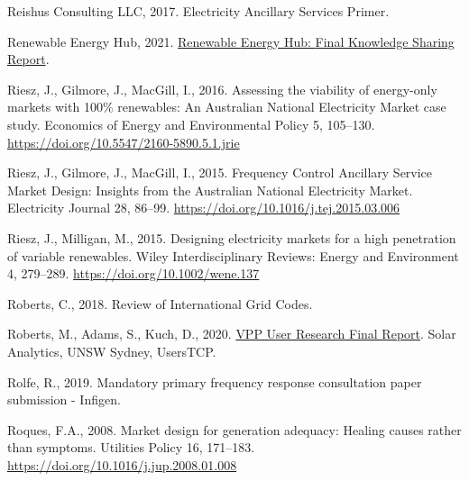 \documentclass[12pt,a4paper,]{report}
\newlength{\cslhangindent}
\newenvironment{CSLReferences}[2] %
 {%
  \setlength{\parindent}{0pt}
  \ifodd #1 \everypar{\setlength{\hangindent}{\cslhangindent}}\ignorespaces\fi
  \ifnum #2 > 0
  \setlength{\parskip}{#2\baselineskip}
  \fi
 }%
 {}
\begin{document}
\begin{CSLReferences}{1}{0}
\leavevmode{}%
Reishus Consulting LLC, 2017. Electricity {Ancillary Services Primer}.

\leavevmode{}%
Renewable Energy Hub, 2021.
\href{https://arena.gov.au/assets/2021/04/renewable-energy-hub-final-report.pdf}{Renewable
{Energy Hub}: {Final Knowledge Sharing Report}}.

\leavevmode{}%
Riesz, J., Gilmore, J., MacGill, I., 2016. Assessing the viability of
energy-only markets with 100\% renewables: {An Australian National
Electricity Market} case study. Economics of Energy and Environmental
Policy 5, 105--130. \url{https://doi.org/10.5547/2160-5890.5.1.jrie}

\leavevmode{}%
Riesz, J., Gilmore, J., MacGill, I., 2015. Frequency {Control Ancillary
Service Market Design}: {Insights} from the {Australian National
Electricity Market}. Electricity Journal 28, 86--99.
\url{https://doi.org/10.1016/j.tej.2015.03.006}

\leavevmode{}%
Riesz, J., Milligan, M., 2015. Designing electricity markets for a high
penetration of variable renewables. Wiley Interdisciplinary Reviews:
Energy and Environment 4, 279--289.
\url{https://doi.org/10.1002/wene.137}

\leavevmode{}%
Roberts, C., 2018. Review of {International Grid Codes}.

\leavevmode{}%
Roberts, M., Adams, S., Kuch, D., 2020.
\href{https://www.ceem.unsw.edu.au/sites/default/files/uploads/publications/VPP\%20User\%20Research\%20-\%20Final\%20Report\%20-\%2020201127r.pdf}{{VPP
User Research Final Report}}. {Solar Analytics, UNSW Sydney, UsersTCP}.

\leavevmode{}%
Rolfe, R., 2019. Mandatory primary frequency response consultation paper
submission - {Infigen}.

\leavevmode{}%
Roques, F.A., 2008. Market design for generation adequacy: {Healing}
causes rather than symptoms. Utilities Policy 16, 171--183.
\url{https://doi.org/10.1016/j.jup.2008.01.008}


\end{CSLReferences}
\end{document}
